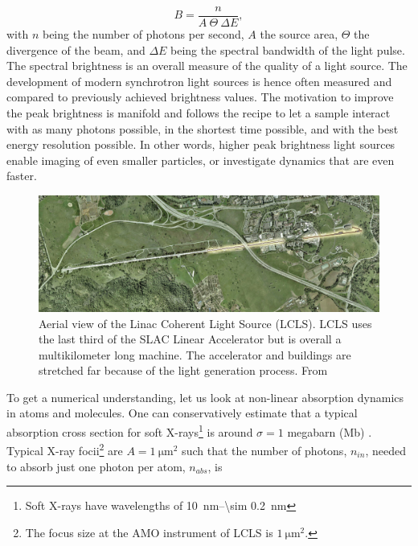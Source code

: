 \begin{equation}
B = \frac{n}{A\ \Theta\ \Delta\! E},
\label{eq:spectral-brightness}
\end{equation}
with $n$ being the number of photons per second, $A$ the source area, $\Theta$ the divergence of the beam, and $\Delta\! E$ being the spectral bandwidth of the light pulse. The spectral brightness is an overall measure of the quality of a light source. The development of modern synchrotron light sources is hence often measured and compared to previously achieved brightness values. The motivation to improve the peak brightness is manifold and follows the recipe to let a sample interact with as many photons possible, in the shortest time possible, and with the best energy resolution possible. In other words, higher peak brightness light sources enable imaging of even smaller particles, or investigate dynamics that are even faster.\\[1\baselineskip]
\begin{figure}[t]
	\centering
		\includegraphics[width=1.00\textwidth]{images/aerial-view-lcls.jpg}
	\caption[Aerial view of the Linac Coherent Light Source.]{Aerial view of the Linac Coherent Light Source (LCLS). LCLS uses the last third of the SLAC Linear Accelerator but is overall a multikilometer long machine. The accelerator and buildings are stretched far because of the light generation process. From \citep{SLAC-2009-Flickr}}
	\label{fig:aerial-view-lcls}
\end{figure}
To get a numerical understanding, let us look at non-linear absorption dynamics in atoms and molecules. One can conservatively estimate that a typical absorption cross section for soft X-rays\footnote{Soft X-rays have wavelengths of \SIrange{10}{\sim 0.2}{\nano\meter}} is around $\sigma = 1$ megabarn (Mb) \citep{Bucksbaum-2011-Book}. Typical X-ray focii\footnote{The focus size at the AMO instrument of LCLS is $\SI{1}{\micro\meter\squared}$.} are $A = \SI{1}{\micro\meter\squared}$ such that the number of photons, $n_{in}$, needed to absorb just one photon per atom, $n_{abs}$, is
